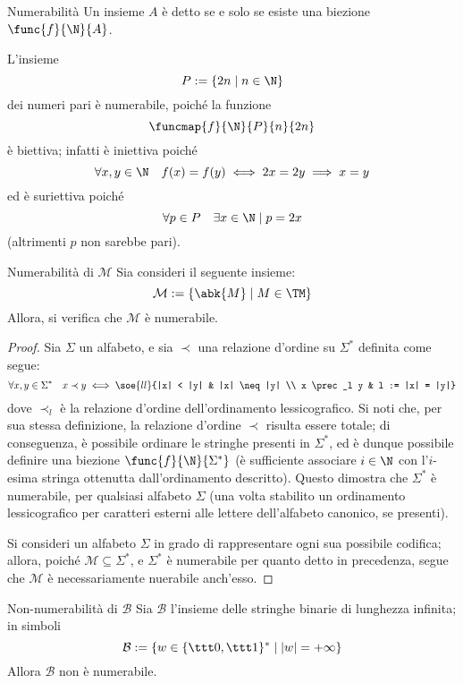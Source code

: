 \documentclass[a4paper, 12pt]{report}
\begin{document}
    \begin{frameddefn}{Numerabilità}
        Un insieme $A$ è detto  se e solo se esiste una biezione $\func{f}{\N}{A}$.
    \end{frameddefn}

    \begin{example}
        L'insieme $$P := \{2n \mid n \in \N\}$$ dei numeri pari è numerabile, poiché la funzione $$\funcmap{f}{\N}{P}{n}{2n}$$ è biettiva; infatti è iniettiva poiché $$\forall x, y \in \N \quad f(x) = f(y) \iff 2x = 2y \implies x = y$$ ed è suriettiva poiché $$\forall p \in P \quad \exists x \in \N \mid p = 2x$$ (altrimenti $p$ non sarebbe pari).
    \end{example}

    \begin{framedlem}[label={num tm}]{Numerabilità di $\mathcal M$}
        Sia consideri il seguente insieme: $$\mathcal M := \{\abk{M} \mid M \in \TM\}$$ Allora, si verifica che $\mathcal M$ è numerabile.
    \end{framedlem}

    \begin{proof}
        Sia $\Sigma$ un alfabeto, e sia $\prec$ una relazione d'ordine su $\Sigma^*$ definita come segue: $$\forall x, y \in \Sigma^* \quad x \prec y \iff \soe{ll}{|x| < |y| & |x| \neq |y| \\ x \prec_l y & l := |x| = |y|}$$ dove $\prec_l$ è la relazione d'ordine dell'ordinamento lessicografico. Si noti che, per sua stessa definizione, la relazione d'ordine $\prec$ risulta essere totale; di conseguenza, è possibile ordinare  le stringhe presenti in $\Sigma^*$, ed è dunque possibile definire una biezione $\func{f}{\N}{\Sigma^*}$ (è sufficiente associare $i \in \N$ con l'$i$-esima stringa ottenutta dall'ordinamento descritto). Questo dimostra che $\Sigma^*$ è numerabile, per qualsiasi alfabeto $\Sigma$ (una volta stabilito un ordinamento lessicografico per caratteri esterni alle lettere dell'alfabeto canonico, se presenti).

        Si consideri un alfabeto $\Sigma$ in grado di rappresentare ogni sua possibile codifica; allora, poiché $\mathcal M \subseteq \Sigma^*$, e $\Sigma^*$ è numerabile per quanto detto in precedenza, segue che $\mathcal M$ è necessariamente nuerabile anch'esso.
    \end{proof}

    \begin{framedprop}[label={not num B}]{Non-numerabilità di $\mathcal B$}
        Sia $\mathcal B$ l'insieme delle stringhe binarie di lunghezza infinita; in simboli $$\mathcal B := \{w \in \{\ttt 0, \ttt 1\}^* \mid |w| = + \infty\}$$ Allora $\mathcal B$ non è numerabile.
    \end{framedprop}
\end{document}
